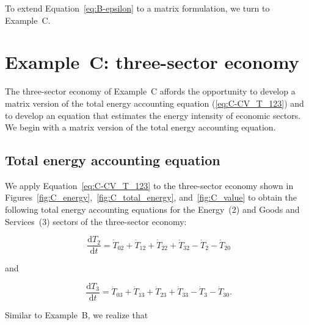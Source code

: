 To extend Equation~\ref{eq:B-epsilon}
to a matrix formulation, we turn to Example~C.


\section{Example~C: three-sector economy} %
\label{sec:C-intensity}

The three-sector economy of Example~C affords the opportunity 
to develop a matrix version 
of the total energy accounting equation (\ref{eq:C-CV_T_123})
and to develop an equation that estimates the
energy intensity of economic sectors. 
We begin with a matrix version of the total energy accounting equation.


\subsection{Total energy accounting equation}

We apply Equation~\ref{eq:C-CV_T_123} to the three-sector
economy shown in 
Figures~\ref{fig:C_energy},~\ref{fig:C_total_energy}, and~\ref{fig:C_value}
to obtain the following total energy accounting equations
for the Energy~(2) and Goods and Services~(3) sectors 
of the three-sector economy:

\begin{equation} \label{eq:C-Total_Energy_Sec_2-a}
	\frac{\mathrm{d}T_{2}}{\mathrm{d}t} 
	= \dot{T}_{02}  
	+ \dot{T}_{12}
	+ \dot{T}_{22}
	+ \dot{T}_{32}
	- \dot{T}_{2}
	- \dot{T}_{20}
\end{equation}

\noindent{}and

\begin{equation} \label{eq:C-Total_Energy_Sec_3-a}
	\frac{\mathrm{d}T_{3}}{\mathrm{d}t} 
	= \dot{T}_{03}  
	+ \dot{T}_{13}
	+ \dot{T}_{23}
	+ \dot{T}_{33}
	- \dot{T}_{3}
	- \dot{T}_{30}.
\end{equation}

\noindent{}Similar to Example~B, we realize that 

